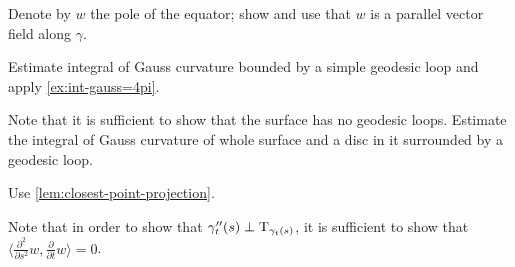  Denote by $w$ the pole of the equator; show and use that $w$ is a parallel vector field along $\gamma$.

 Estimate integral of Gauss curvature bounded by a simple geodesic loop and apply \ref{ex:int-gauss=4pi}.

 Note that it is sufficient to show that the surface has no geodesic loops.
Estimate the integral of Gauss curvature of whole surface and a disc in it surrounded by a geodesic loop.



 Use \ref{lem:closest-point-projection}.



 Note that in order to show that $\gamma''_t(s)\perp\mathrm{T}_{\gamma_t(s)}$, it is sufficient to show that $\langle\tfrac{\partial^2}{\partial s^2}w,\tfrac{\partial}{\partial t}w\rangle=0$.






